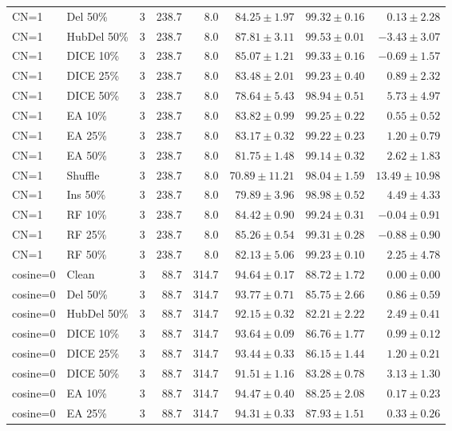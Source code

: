 {\begin{longtable}{llrrrrrr}
CN=1 & Del 50\% & 3 & 238.7 & 8.0 & $84.25\pm1.97$ & $99.32\pm0.16$ & $0.13\pm2.28$ \\
CN=1 & HubDel 50\% & 3 & 238.7 & 8.0 & $87.81\pm3.11$ & $99.53\pm0.01$ & $-3.43\pm3.07$ \\
CN=1 & DICE 10\% & 3 & 238.7 & 8.0 & $85.07\pm1.21$ & $99.33\pm0.16$ & $-0.69\pm1.57$ \\
CN=1 & DICE 25\% & 3 & 238.7 & 8.0 & $83.48\pm2.01$ & $99.23\pm0.40$ & $0.89\pm2.32$ \\
CN=1 & DICE 50\% & 3 & 238.7 & 8.0 & $78.64\pm5.43$ & $98.94\pm0.51$ & $5.73\pm4.97$ \\
CN=1 & EA 10\% & 3 & 238.7 & 8.0 & $83.82\pm0.99$ & $99.25\pm0.22$ & $0.55\pm0.52$ \\
CN=1 & EA 25\% & 3 & 238.7 & 8.0 & $83.17\pm0.32$ & $99.22\pm0.23$ & $1.20\pm0.79$ \\
CN=1 & EA 50\% & 3 & 238.7 & 8.0 & $81.75\pm1.48$ & $99.14\pm0.32$ & $2.62\pm1.83$ \\
CN=1 & Shuffle & 3 & 238.7 & 8.0 & $70.89\pm11.21$ & $98.04\pm1.59$ & $13.49\pm10.98$ \\
CN=1 & Ins 50\% & 3 & 238.7 & 8.0 & $79.89\pm3.96$ & $98.98\pm0.52$ & $4.49\pm4.33$ \\
CN=1 & RF 10\% & 3 & 238.7 & 8.0 & $84.42\pm0.90$ & $99.24\pm0.31$ & $-0.04\pm0.91$ \\
CN=1 & RF 25\% & 3 & 238.7 & 8.0 & $85.26\pm0.54$ & $99.31\pm0.28$ & $-0.88\pm0.90$ \\
CN=1 & RF 50\% & 3 & 238.7 & 8.0 & $82.13\pm5.06$ & $99.23\pm0.10$ & $2.25\pm4.78$ \\
cosine=0 & Clean & 3 & 88.7 & 314.7 & $94.64\pm0.17$ & $88.72\pm1.72$ & $0.00\pm0.00$ \\
cosine=0 & Del 50\% & 3 & 88.7 & 314.7 & $93.77\pm0.71$ & $85.75\pm2.66$ & $0.86\pm0.59$ \\
cosine=0 & HubDel 50\% & 3 & 88.7 & 314.7 & $92.15\pm0.32$ & $82.21\pm2.22$ & $2.49\pm0.41$ \\
cosine=0 & DICE 10\% & 3 & 88.7 & 314.7 & $93.64\pm0.09$ & $86.76\pm1.77$ & $0.99\pm0.12$ \\
cosine=0 & DICE 25\% & 3 & 88.7 & 314.7 & $93.44\pm0.33$ & $86.15\pm1.44$ & $1.20\pm0.21$ \\
cosine=0 & DICE 50\% & 3 & 88.7 & 314.7 & $91.51\pm1.16$ & $83.28\pm0.78$ & $3.13\pm1.30$ \\
cosine=0 & EA 10\% & 3 & 88.7 & 314.7 & $94.47\pm0.40$ & $88.25\pm2.08$ & $0.17\pm0.23$ \\
cosine=0 & EA 25\% & 3 & 88.7 & 314.7 & $94.31\pm0.33$ & $87.93\pm1.51$ & $0.33\pm0.26$ \\

\end{longtable}}
